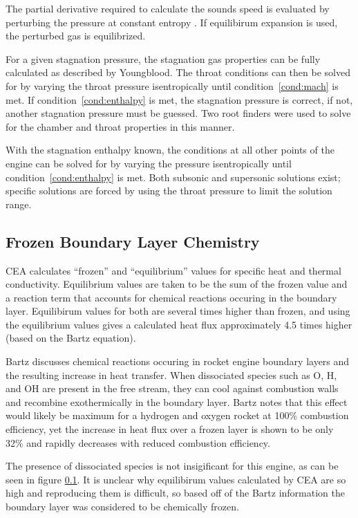 \documentclass[11pt]{article}
\begin{document}
The partial derivative required to calculate the sounds speed is evaluated by perturbing the pressure at constant entropy \cite{}. If equilibirum expansion is used, the perturbed gas is equilibrized.

For a given stagnation pressure, the stagnation gas properties can be fully calculated as described by Youngblood. The throat conditions can then be solved for by varying the throat pressure isentropically until condition~\ref{cond:mach} is met. If condition~\ref{cond:enthalpy} is met, the stagnation pressure is correct, if not, another stagnation pressure must be guessed. Two root finders were used to solve for the chamber and throat properties in this manner.

With the stagnation enthalpy known, the conditions at all other points of the engine can be solved for by varying the pressure isentropically until condition~\ref{cond:enthalpy} is met. Both subsonic and supersonic solutions exist; specific solutions are forced by using the throat pressure to limit the solution range.


\subsection{Frozen Boundary Layer Chemistry}

CEA calculates ``frozen'' and ``equilibrium'' values for specific heat and thermal conductivity. Equilibrium values are taken to be the sum of the frozen value and a reaction term that accounts for chemical reactions occuring in the boundary layer. Equilibirum values for both are several times higher than frozen, and using the equilibrium values gives a calculated heat flux approximately 4.5 times higher (based on the Bartz equation).

Bartz \cite{page 46} discusses chemical reactions occuring in rocket engine boundary layers and the resulting increase in heat transfer. When dissociated species such as O, H, and OH are present in the free stream, they can cool against combustion walls and recombine exothermically in the boundary layer. Bartz notes that this effect would likely be maximum for a hydrogen and oxygen rocket at 100\% combustion efficiency, yet the increase in heat flux over a frozen layer is shown to be only 32\% and rapidly decreases with reduced combustion efficiency.

The presence of dissociated species is not insigificant for this engine, as can be seen in figure \ref{}. It is unclear why equilibirum values calculated by CEA are so high and reproducing them is difficult, so based off of the Bartz information the boundary layer was considered to be chemically frozen.
\end{document}
